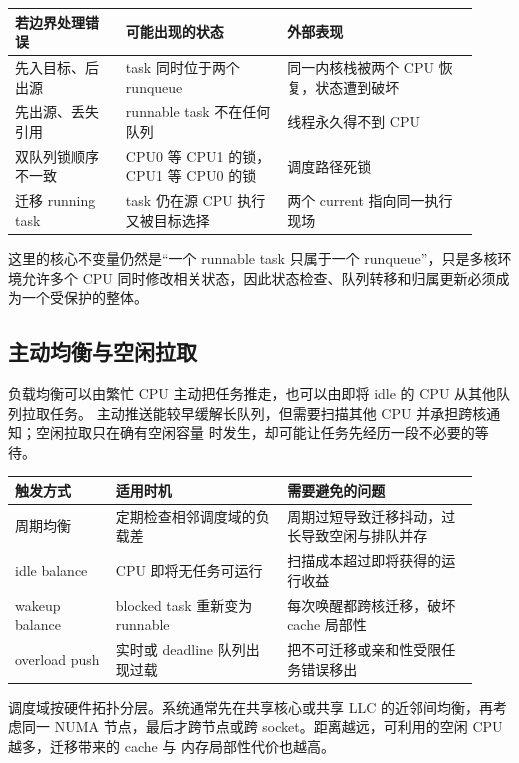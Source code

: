\begin{longtable}{|L{0.22\linewidth}|L{0.32\linewidth}|L{0.38\linewidth}|}
\toprule
若边界处理错误 & 可能出现的状态 & 外部表现 \\
\midrule
先入目标、后出源 & task 同时位于两个 runqueue & 同一内核栈被两个 CPU 恢复，状态遭到破坏 \\\tablerowrule
先出源、丢失引用 & runnable task 不在任何队列 & 线程永久得不到 CPU \\\tablerowrule
双队列锁顺序不一致 & CPU0 等 CPU1 的锁，CPU1 等 CPU0 的锁 & 调度路径死锁 \\\tablerowrule
迁移 running task & task 仍在源 CPU 执行又被目标选择 & 两个 current 指向同一执行现场 \\
\bottomrule
\end{longtable}

这里的核心不变量仍然是“一个 runnable task 只属于一个 runqueue”，只是多核环境允许多个
CPU 同时修改相关状态，因此状态检查、队列转移和归属更新必须成为一个受保护的整体。

\subsection{主动均衡与空闲拉取}

负载均衡可以由繁忙 CPU 主动把任务推走，也可以由即将 idle 的 CPU 从其他队列拉取任务。
主动推送能较早缓解长队列，但需要扫描其他 CPU 并承担跨核通知；空闲拉取只在确有空闲容量
时发生，却可能让任务先经历一段不必要的等待。

\begin{longtable}{|L{0.2\linewidth}|L{0.34\linewidth}|L{0.38\linewidth}|}
\toprule
触发方式 & 适用时机 & 需要避免的问题 \\
\midrule
周期均衡 & 定期检查相邻调度域的负载差 & 周期过短导致迁移抖动，过长导致空闲与排队并存 \\\tablerowrule
idle balance & CPU 即将无任务可运行 & 扫描成本超过即将获得的运行收益 \\\tablerowrule
wakeup balance & blocked task 重新变为 runnable & 每次唤醒都跨核迁移，破坏 cache 局部性 \\\tablerowrule
overload push & 实时或 deadline 队列出现过载 & 把不可迁移或亲和性受限任务错误移出 \\
\bottomrule
\end{longtable}

调度域按硬件拓扑分层。系统通常先在共享核心或共享 LLC 的近邻间均衡，再考虑同一 NUMA
节点，最后才跨节点或跨 socket。距离越远，可利用的空闲 CPU 越多，迁移带来的 cache 与
内存局部性代价也越高。

